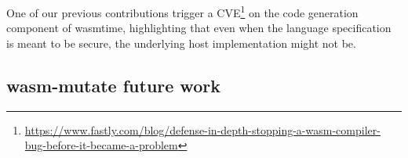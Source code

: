 
One of our previous contributions trigger a CVE\footnote{\url{https://www.fastly.com/blog/defense-in-depth-stopping-a-wasm-compiler-bug-before-it-became-a-problem}} on the code generation component of wasmtime, highlighting that even when the language specification is meant to be secure, the underlying host implementation might not be. 


\subsection{wasm-mutate future work}


